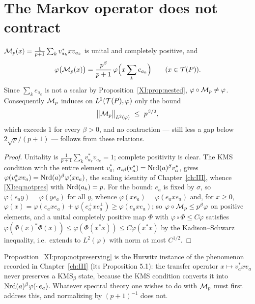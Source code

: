 \section{The Markov operator does not contract}

\begin{proposition}\label{XI:prop:notpreserving}
$\mathcal{M}_p(x)=\frac{1}{p+1}\sum_kv_{a_k}^*xv_{a_k}$ is unital and completely positive, and
\begin{equation}\label{XI:eq:notpres}
\varphi\bigl(\mathcal{M}_p(x)\bigr)=\frac{p^{\beta}}{p+1}\,\varphi\Bigl(x\sum_{k}e_{a_k}\Bigr)
\qquad(x\in\mathcal{T}(P)).
\end{equation}
Since $\sum_ke_{a_k}$ is not a scalar by Proposition~\ref{XI:prop:nested}, $\varphi\circ\mathcal{M}_p\ne\varphi$.
Consequently $\mathcal{M}_p$ induces on $L^2(\mathcal{T}(P),\varphi)$ only the bound
\[
\bigl\|\cM_p\bigr\|_{L^2(\varphi)}\ \le\ p^{\beta/2},
\]
which exceeds $1$ for every $\beta>0$, and no contraction --- still less a gap below
$2\sqrt p/(p+1)$ --- follows from these relations.
\end{proposition}

\begin{proof}
Unitality is $\frac1{p+1}\sum_kv_{a_k}^*v_{a_k}=1$; complete positivity is clear. The KMS
condition with the entire element $v_a^*$, $\sigma_{i\beta}(v_a^*)=\operatorname{Nrd}(a)^{\beta}v_a^*$,
gives $\varphi(v_a^*xv_a)=\operatorname{Nrd}(a)^{\beta}\varphi(xe_a)$, the scaling identity of Chapter~\ref{ch:III},
whence \eqref{XI:eq:notpres} with $\operatorname{Nrd}(a_k)=p$. For the bound: $e_a$ is fixed by $\sigma$, so
$\varphi(e_ay)=\varphi(ye_a)$ for all $y$, whence $\varphi(xe_a)=\varphi(e_axe_a)$ and, for
$x\ge0$, $\varphi(x)=\varphi(e_axe_a)+\varphi(e_a^\perp xe_a^\perp)\ge\varphi(e_axe_a)$; so
$\varphi\circ\mathcal{M}_p\le p^{\beta}\varphi$ on positive elements, and a unital completely positive
map $\Phi$ with $\varphi\circ\Phi\le C\varphi$ satisfies
$\varphi(\Phi(x)^*\Phi(x))\le\varphi(\Phi(x^*x))\le C\varphi(x^*x)$ by the Kadison--Schwarz
inequality, i.e.\ extends to $L^2(\varphi)$ with norm at most $C^{1/2}$.
\end{proof}

\begin{remark}\label{XI:rem:sameas}
Proposition~\ref{XI:prop:notpreserving} is the Hurwitz instance of the phenomenon recorded in
Chapter~\ref{ch:III} (its Proposition 5.1): the transfer operator $x\mapsto v_a^*xv_a$ never preserves a
$\mathrm{KMS}_\beta$ state, because the KMS condition converts it into
$\operatorname{Nrd}(a)^\beta\varphi(\cdot\,e_a)$. Whatever spectral theory one wishes to do with $\mathcal{M}_p$
must first address this, and normalizing by $(p+1)^{-1}$ does not.
\end{remark}

